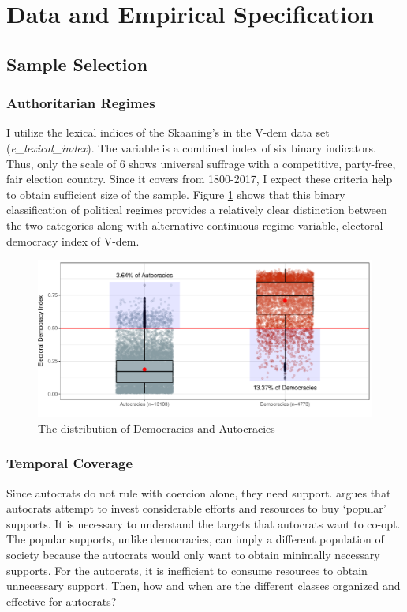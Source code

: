 \documentclass[11pt]{article}
\begin{document}
\section{Data and Empirical Specification}
\subsection{Sample Selection}
\subsubsection{Authoritarian Regimes}

I utilize the lexical indices of the Skaaning's in the V-dem data set (\textit{e\_lexical\_index}). The variable is a combined index of six binary indicators. Thus, only the scale of 6 shows universal suffrage with a competitive, party-free, fair election country. Since it covers from 1800-2017, I expect these criteria help to obtain sufficient size of the sample. Figure \ref{fig:plot1} shows that this binary classification of political regimes provides a relatively clear distinction between the two categories along with alternative continuous regime variable, electoral democracy index of V-dem.\\\par

\begin{figure}[!htbt]
	\centering
	\includegraphics[width=0.85\linewidth]{"../3. Datasets_Codebooks/Figures/Plot1"}
	\caption{The distribution of Democracies and Autocracies}
	\label{fig:plot1}
\end{figure}

\subsubsection{Temporal Coverage}

Since autocrats do not rule with coercion alone, they need support. \citet{Cassani2017a} argues that autocrats attempt to invest considerable efforts and resources to buy `popular' supports. It is necessary to understand the targets that autocrats want to co-opt. The popular supports, unlike democracies, can imply a different population of society because the autocrats would only want to obtain minimally necessary supports. For the autocrats, it is inefficient to consume resources to obtain unnecessary support. Then, how and when are the different classes organized and effective for autocrats? 
\end{document}
